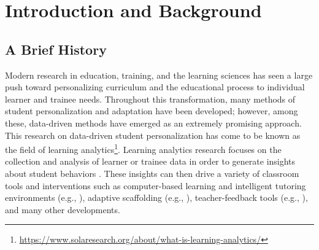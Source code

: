 \documentclass[manuscript,screen,review]{acmart}
\begin{document}

\maketitle


\section{Introduction and Background} \label{sec:intro_background}

\subsection{A Brief History}

Modern research in education, training, and the learning sciences has seen a large push toward personalizing curriculum and the educational process to individual learner and trainee needs. Throughout this transformation, many methods of student personalization and adaptation have been developed; however, among these, data-driven methods have emerged as an extremely promising approach. This research on data-driven student personalization has come to be known as the field of learning analytics\footnote{\href{https://www.solaresearch.org/about/what-is-learning-analytics/}{https://www.solaresearch.org/about/what-is-learning-analytics/}}. Learning analytics research focuses on the collection and analysis of learner or trainee data in order to generate insights about student behaviors \cite{maseleno2018demystifying, Zilvinskis2017}. These insights can then drive a variety of classroom tools and interventions such as computer-based learning and intelligent tutoring environments (e.g., \cite{heffernan2014assistments, leelawong2008designing}), adaptive scaffolding (e.g., \cite{1598166515, basu2017learner}), teacher-feedback tools (e.g., \cite{rodriguez2018teacher, Hutchins2023}), and many other developments. 
\end{document}
